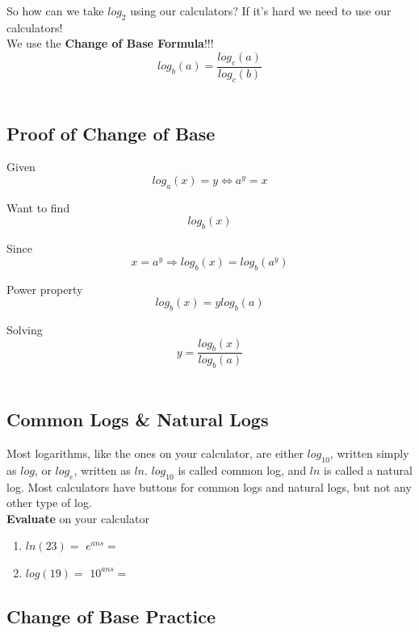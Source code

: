 \documentclass[12pt]{article}
\begin{document}
So how can we take $log_2$ using our calculators? If it's hard we need to use our calculators!\\

We use the \textbf{Change of Base Formula}!!!\\

$$log_{b}(a)=\frac{log_{c}(a)}{log_{c}(b)}$$\\




\subsection{Proof of Change of Base}

Given $$log_{a}(x)=y \Longleftrightarrow a^y=x$$

Want to find $$log_{b}(x)$$

Since $$x=a^y \Longrightarrow log_{b}(x)=log_{b}(a^y)$$

Power property $$log_{b}(x)=ylog_{b}(a)$$

Solving $$y=\frac{log_{b}(x)}{log_{b}(a)}$$\\

\subsection{Common Logs \& Natural Logs}

Most logarithms, like the ones on your calculator, are either $log_{10}$, written simply as $log$, or $log_{e}$, written as $ln$. $log_{10}$ is called common log, and $ln$ is called a natural log. Most calculators have buttons for common logs and natural logs, but not any other type of log.\\

\textbf{Evaluate} on your calculator\\

\begin{enumerate}
	\item $ln(23)=$ \hspace{2in} $e^{ans}=$\\
	
	\item $log(19)=$ \hspace{2in} $10^{ans}=$\\
\end{enumerate}

\pagebreak

\subsection{Change of Base Practice}
\end{document}
